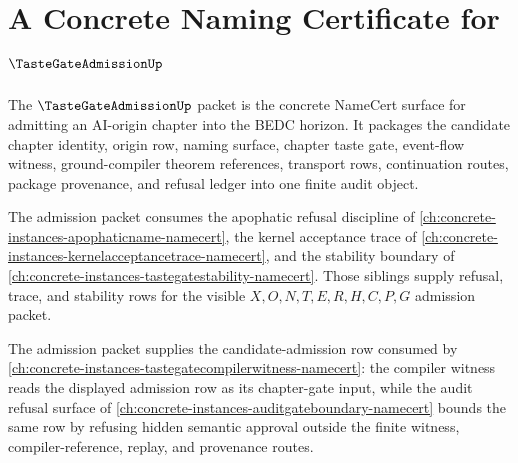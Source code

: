 \chapter{A Concrete Naming Certificate for $\TasteGateAdmissionUp$}
\label{ch:concrete-instances-tastegateadmission-namecert}

The $\TasteGateAdmissionUp$ packet is the concrete NameCert surface for admitting an AI-origin chapter into the BEDC horizon. It packages the candidate chapter identity, origin row, naming surface, chapter taste gate, event-flow witness, ground-compiler theorem references, transport rows, continuation routes, package provenance, and refusal ledger into one finite audit object.

The admission packet consumes the apophatic refusal discipline of \autoref{ch:concrete-instances-apophaticname-namecert}, the kernel acceptance trace of \autoref{ch:concrete-instances-kernelacceptancetrace-namecert}, and the stability boundary of \autoref{ch:concrete-instances-tastegatestability-namecert}. Those siblings supply refusal, trace, and stability rows for the visible $X,O,N,T,E,R,H,C,P,G$ admission packet.

The admission packet supplies the candidate-admission row consumed by \autoref{ch:concrete-instances-tastegatecompilerwitness-namecert}: the compiler witness reads the displayed admission row as its chapter-gate input, while the audit refusal surface of \autoref{ch:concrete-instances-auditgateboundary-namecert} bounds the same row by refusing hidden semantic approval outside the finite witness, compiler-reference, replay, and provenance routes.

